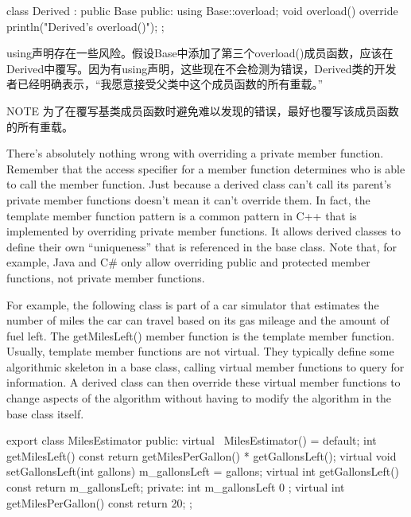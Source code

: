 \begin{cpp}
class Derived : public Base
{
    public:
        using Base::overload;
        void overload() override { println("Derived's overload()"); }
};
\end{cpp}

using声明存在一些风险。假设Base中添加了第三个overload()成员函数，应该在Derived中覆写。因为有using声明，这些现在不会检测为错误，Derived类的开发者已经明确表示，“我愿意接受父类中这个成员函数的所有重载。”

\begin{myNotic}{NOTE}
为了在覆写基类成员函数时避免难以发现的错误，最好也覆写该成员函数的所有重载。
\end{myNotic}


There’s absolutely nothing wrong with overriding a private member function. Remember that the access specifier for a member function determines who is able to call the member function. Just because a derived class can’t call its parent’s private member functions doesn’t mean it can’t override them. In fact, the template member function pattern is a common pattern in C++ that is implemented by overriding private member functions. It allows derived classes to define their own “uniqueness” that is referenced in the base class. Note that, for example, Java and C\# only allow overriding public and protected member functions, not private member functions.

For example, the following class is part of a car simulator that estimates the number of miles the car can travel based on its gas mileage and the amount of fuel left. The getMilesLeft() member function is the template member function. Usually, template member functions are not virtual. They typically define some algorithmic skeleton in a base class, calling virtual member functions to query for information. A derived class can then override these virtual member functions to change aspects of the algorithm without having to modify the algorithm in the base class itself.

\begin{cpp}
export class MilesEstimator
{
    public:
        virtual ~MilesEstimator() = default;
        int getMilesLeft() const { return getMilesPerGallon() * getGallonsLeft(); }
        virtual void setGallonsLeft(int gallons) { m_gallonsLeft = gallons; }
        virtual int getGallonsLeft() const { return m_gallonsLeft; }
    private:
        int m_gallonsLeft { 0 };
        virtual int getMilesPerGallon() const { return 20; }
};
\end{cpp}

